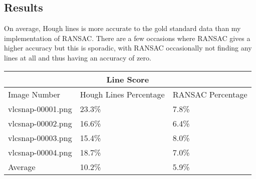 \documentclass[paper=a4, fontsize=11pt]{scrartcl}
\numberwithin{equation}{section}		%
\numberwithin{figure}{section}			%
\numberwithin{table}{section}				%
\begin{document}
\subsection{Results}

On average, Hough lines is more accurate to the gold standard data than my implementation of RANSAC. There are a few occasions where RANSAC gives a higher accuracy but this is sporadic, with RANSAC occasionally not finding any lines at all and thus having an accuracy of zero.

\begin{tabular}{ |p{5cm}||p{5cm}|p{5cm}|  }
 \hline
 \multicolumn{3}{|c|}{Line Score} \\
 \hline
 Image Number & Hough Lines Percentage & RANSAC Percentage\\
 \hline
 vlcsnap-00001.png   & 23.3\% & 7.8\% \\
 vlcsnap-00002.png   & 16.6\% & 6.4\% \\
 vlcsnap-00003.png   & 15.4\% & 8.0\% \\
 vlcsnap-00004.png   & 18.7\% & 7.0\% \\
 \hline
 Average & 10.2\% & 5.9\% \\
 \hline
\end{tabular}

\end{document}
